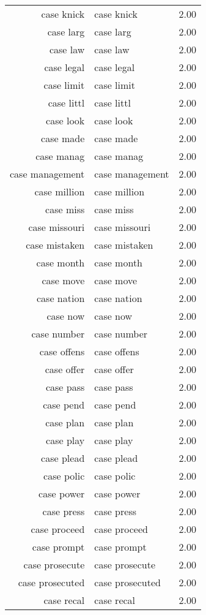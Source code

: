 \begin{table}[ht]
\begin{tabular}{rlr}
  case knick & case knick & 2.00 \\ 
  case larg & case larg & 2.00 \\ 
  case law & case law & 2.00 \\ 
  case legal & case legal & 2.00 \\ 
  case limit & case limit & 2.00 \\ 
  case littl & case littl & 2.00 \\ 
  case look & case look & 2.00 \\ 
  case made & case made & 2.00 \\ 
  case manag & case manag & 2.00 \\ 
  case management & case management & 2.00 \\ 
  case million & case million & 2.00 \\ 
  case miss & case miss & 2.00 \\ 
  case missouri & case missouri & 2.00 \\ 
  case mistaken & case mistaken & 2.00 \\ 
  case month & case month & 2.00 \\ 
  case move & case move & 2.00 \\ 
  case nation & case nation & 2.00 \\ 
  case now & case now & 2.00 \\ 
  case number & case number & 2.00 \\ 
  case offens & case offens & 2.00 \\ 
  case offer & case offer & 2.00 \\ 
  case pass & case pass & 2.00 \\ 
  case pend & case pend & 2.00 \\ 
  case plan & case plan & 2.00 \\ 
  case play & case play & 2.00 \\ 
  case plead & case plead & 2.00 \\ 
  case polic & case polic & 2.00 \\ 
  case power & case power & 2.00 \\ 
  case press & case press & 2.00 \\ 
  case proceed & case proceed & 2.00 \\ 
  case prompt & case prompt & 2.00 \\ 
  case prosecute & case prosecute & 2.00 \\ 
  case prosecuted & case prosecuted & 2.00 \\ 
  case recal & case recal & 2.00 \\ 

\end{tabular}
\end{table}
